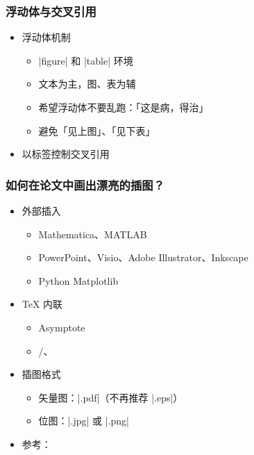 \begin{frame}[fragile]
\frametitle{浮动体与交叉引用}
\begin{itemize}
  \item<+-> 浮动体机制
    \begin{itemize}
      \item |figure| 和 |table| 环境
      \item 文本为主，图、表为辅
      \item 希望浮动体不要乱跑：「这是病，得治」
      \item 避免「见上图」、「见下表」
    \end{itemize}
  \item<+-> 以标签控制交叉引用
\end{itemize}
\end{frame}

\begin{frame}[fragile]
\frametitle{如何在论文中画出漂亮的插图？}
\begin{itemize}
  \item<+-> 外部插入
    \begin{itemize}
      \item Mathematica、MATLAB
      \item PowerPoint、Visio、Adobe Illustrator、Inkscape
      \item Python \alert{Matplotlib}
    \end{itemize}
  \item<+-> \TeX{} 内联
    \begin{itemize}
      \item Asymptote
      \item \alert{/、}
    \end{itemize}
  \item<+-> 插图格式
    \begin{itemize}
      \item 矢量图：|.pdf|（\alert{不再推荐} |.eps|）
      \item 位图：|.jpg| 或 |.png|
    \end{itemize}
  \item<+-> 参考：
\end{itemize}
\end{frame}

